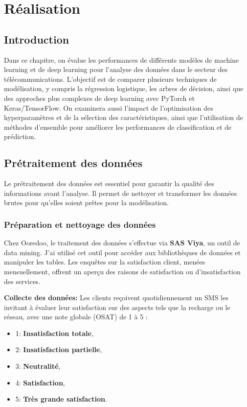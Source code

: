 \chapter{Réalisation}
\begin{spacing}{1.2}
\minitoc
\thispagestyle{MyStyle}
\end{spacing}
\newpage
\justifying

\sloppy {} 
\section{Introduction}

Dans ce chapitre, on évalue les performances de différents modèles de machine learning et de deep learning pour l'analyse des données dans le secteur des télécommunications. L'objectif est de comparer plusieurs techniques de modélisation, y compris la régression logistique, les arbres de décision, ainsi que des approches plus complexes de deep learning avec PyTorch et Keras/TensorFlow. On examinera aussi l'impact de l'optimisation des hyperparamètres et de la sélection des caractéristiques, ainsi que l'utilisation de méthodes d'ensemble pour améliorer les performances de classification et de prédiction.

\section{Prétraitement des données}

Le prétraitement des données est essentiel pour garantir la qualité des informations avant l'analyse. Il permet de nettoyer et transformer les données brutes pour qu'elles soient prêtes pour la modélisation.

\subsection{Préparation et nettoyage des données}

Chez Ooredoo, le traitement des données s'effectue via \textbf{SAS Viya}, un outil de data mining. J'ai utilisé cet outil pour accéder aux bibliothèques de données et manipuler les tables. Les enquêtes sur la satisfaction client, menées mensuellement, offrent un aperçu des raisons de satisfaction ou d'insatisfaction des services.

\textbf{Collecte des données:}
Les clients reçoivent quotidiennement un SMS les invitant à évaluer leur satisfaction sur des aspects tels que la recharge ou le réseau, avec une note globale (OSAT) de 1 à 5 :
\begin{itemize}
    \item 1: \textbf{Insatisfaction totale},
    \item 2: \textbf{Insatisfaction partielle},
    \item 3: \textbf{Neutralité},
    \item 4: \textbf{Satisfaction},
    \item 5: \textbf{Très grande satisfaction}.
\end{itemize}

